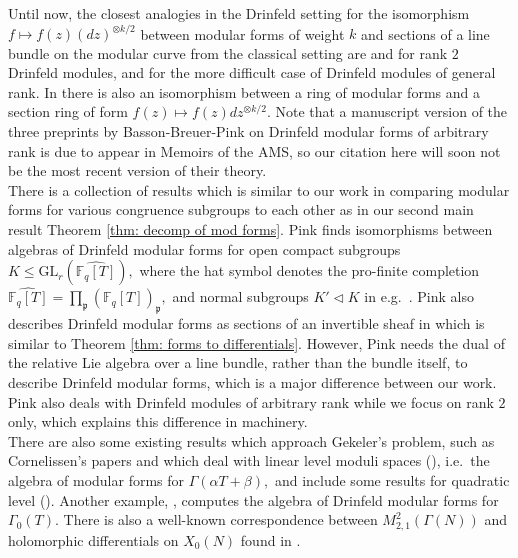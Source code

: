 \documentclass[11pt]{amsart}
\theoremstyle{definition}
\numberwithin{equation}{section}
\newcommand{\GL}{\mathrm{GL}} 	%
\newcommand{\bbF}{\mathbb{F}}		%
\newcommand{\bbP}{\mathbb{P}}		%
\begin{document}
		Until now, the closest analogies in the Drinfeld setting for the isomorphism $f\mapsto f(z)(dz)^{\otimes k/2}$ between modular forms of weight $k$ and sections of a line bundle on the modular curve from the classical setting are \cite[Proposition $5.6$]{Bockle-EichlerShimura} and \cite[Theorem $5.4$]{Gekeler-Curves} for rank $2$ Drinfeld modules, and \cite[Definition $(10.1)$]{Basson-Breuer-Pink-part2} for the more difficult case of Drinfeld modules of general rank. In \cite[Lemma $(10.7)$]{Basson-Breuer-Pink-part2} there is also an isomorphism between a ring of modular forms and a section ring of form $f(z)\mapsto f(z)dz^{\otimes k/2}.$ Note that a manuscript version of the three preprints by Basson-Breuer-Pink on Drinfeld modular forms of arbitrary rank is due to appear in Memoirs of the AMS, so our citation here will soon not be the most recent version of their theory.\\ 
		
		There is a collection of results which is similar to our work in comparing modular forms for various congruence subgroups to each other as in our second main result Theorem \ref{thm: decomp of mod forms}. Pink finds isomorphisms between algebras of Drinfeld modular forms for open compact subgroups $K\leq \GL_r(\widehat{\bbF_q[T]}),$ where the hat symbol denotes the pro-finite completion $\widehat{\bbF_q[T]}=\prod_{\mathfrak{p}} (\bbF_q[T])_{\mathfrak{p}},$ and normal subgroups $K'\lhd K$ in e.g.\ \cite[Proposition $5.5$]{Pink-compactification-Drinfeld-modular-varieties-2012}. Pink also describes Drinfeld modular forms as sections of an invertible sheaf in \cite[Section $5$]{Pink-compactification-Drinfeld-modular-varieties-2012} which is similar to Theorem \ref{thm: forms to differentials}. However, Pink needs the dual of the relative Lie algebra over a line bundle, rather than the bundle itself, to describe Drinfeld modular forms, which is a major difference between our work. Pink also deals with Drinfeld modules of arbitrary rank while we focus on rank $2$ only, which explains this difference in machinery.\\
		
		There are also some existing results which approach Gekeler's problem, such as Cornelissen's papers \cite{Cornelissen-lvlT} and \cite{Cornelissen-wt1} which deal with linear level moduli spaces (\cite[Theorem $(3.3)$]{Cornelissen-wt1}), i.e.\ the algebra of modular forms for $\Gamma(\alpha T+\beta),$ and include some results for quadratic level (\cite[Proposition $(3.4)$]{Cornelissen-wt1}). 
		Another example, \cite[Theorem $(4.4)$]{Dalal-Kumar-Gamma_0(T)-structure}, computes the algebra of Drinfeld modular forms for $\Gamma_0(T).$ There is also a well-known correspondence between $M^2_{2,1}(\Gamma(N))$ and holomorphic differentials on $X_0(N)$ found in \cite[Section $2.10$]{Gekeler-jacobians}.\\
		
\end{document}
